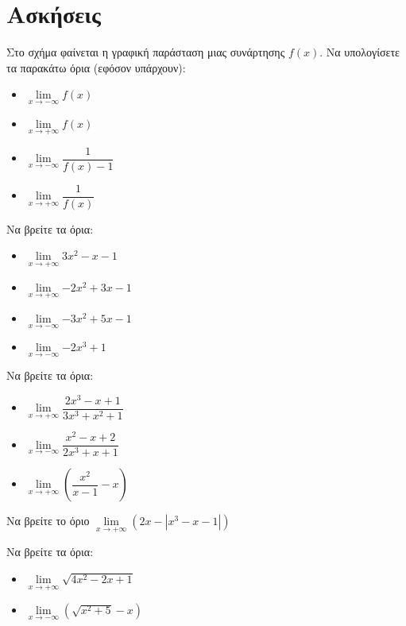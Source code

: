 \documentclass{presentation}
\begin{document}
\section{Ασκήσεις}
\begin{askisi}
  Στο σχήμα
  \href{https://www.geogebra.org/m/p9xmedm8}{}
  φαίνεται η γραφική παράσταση μιας συνάρτησης $f(x)$. Να υπολογίσετε τα παρακάτω όρια (εφόσον υπάρχουν):
  \begin{itemize}
    \item $\lim\limits_{x \to -\infty}{ f(x) }$ \pause
    \item $\lim\limits_{x \to +\infty}{ f(x) }$ \pause
    \item $\lim\limits_{x \to -\infty}{ \dfrac{1}{f(x)-1} }$ \pause
    \item $\lim\limits_{x \to +\infty}{ \dfrac{1}{f(x)} }$
  \end{itemize}
\end{askisi}

\begin{askisi}
  Να βρείτε τα όρια:
  \begin{itemize}
    \item $\lim\limits_{x \to +\infty}{ 3x^2-x-1 }$ \pause
    \item $\lim\limits_{x \to +\infty}{ -2x^2+3x-1 }$ \pause
    \item $\lim\limits_{x \to -\infty}{ -3x^2+5x-1 }$ \pause
    \item $\lim\limits_{x \to -\infty}{ -2x^3+1 }$
  \end{itemize}
\end{askisi}

\begin{askisi}
  Να βρείτε τα όρια:
  \begin{itemize}
    \item $\lim\limits_{x \to +\infty}{ \dfrac{2x^3-x+1}{3x^3+x^2+1} }$ \pause
    \item $\lim\limits_{x \to -\infty}{ \dfrac{x^2-x+2}{2x^3+x+1} }$ \pause
    \item $\lim\limits_{x \to +\infty}{ \left( \dfrac{x^2}{x-1}-x  \right)  }$
  \end{itemize}
\end{askisi}

\begin{askisi}
  Να βρείτε το όριο $\lim\limits_{x \to +\infty}{ \left( 2x-|x^3-x-1| \right)  }$
\end{askisi}

\begin{askisi}
  Να βρείτε τα όρια:
  \begin{itemize}
    \item $\lim\limits_{x \to +\infty}{ \sqrt{4x^2-2x+1} }$ \pause
    \item $\lim\limits_{x \to -\infty}{ \left( \sqrt{x^2+5} -x \right)  }$
  \end{itemize}
\end{askisi}
\end{document}
